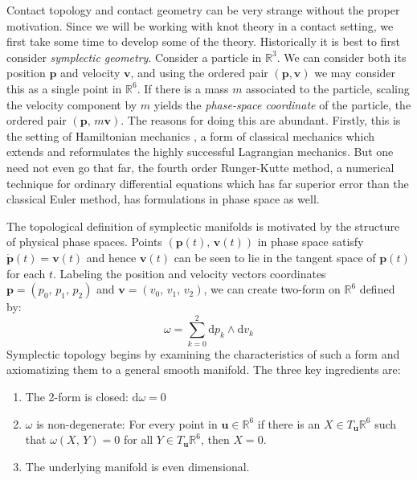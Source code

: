 Contact topology and contact geometry can be very strange without the
proper motivation. Since we will be working with knot theory in a contact
setting, we first take some time to develop some of the theory. Historically it
is best to first consider \textit{symplectic geometry}. Consider a particle
in $\mathbb{R}^{3}$. We can consider both its position $\mathbf{p}$ and
velocity $\mathbf{v}$, and using the ordered pair $(\mathbf{p},\mathbf{v})$
we may consider this as a single point in $\mathbb{R}^{6}$. If there is a mass
$m$ associated to the particle, scaling the velocity component by $m$ yields
the \textit{phase-space coordinate} of the particle, the ordered pair
$(\mathbf{p},\,m\mathbf{v})$. The reasons for doing this are abundant. Firstly,
this is the setting of Hamiltonian mechanics
\cite{HamiltonMechanics1833}, a form of classical mechanics which extends and
reformulates the highly successful Lagrangian mechanics. But one need not even
go that far, the fourth order Runger-Kutte method, a numerical technique for
ordinary differential equations which has far superior error than the classical
Euler method, has formulations in phase space as well.
\par\hfill\par
The topological definition of symplectic manifolds is motivated by the
structure of physical phase spaces. Points $(\mathbf{p}(t),\,\mathbf{v}(t))$ in
phase space satisfy $\dot{\mathbf{p}}(t)=\mathbf{v}(t)$ and hence
$\mathbf{v}(t)$ can be seen to lie in the tangent space of $\mathbf{p}(t)$ for
each $t$. Labeling the position and velocity vectors
coordinates $\mathbf{p}=(p_{0},\,p_{1},\,p_{2})$ and
$\mathbf{v}=(v_{0},\,v_{1},\,v_{2})$, we can create two-form on
$\mathbb{R}^{6}$ defined by:
\begin{equation}
    \label{eqn:symplectic_louiville_form}
    \omega=\sum_{k=0}^{2}\textrm{d}p_{k}\land\textrm{d}v_{k}
\end{equation}
Symplectic topology begins by examining the characteristics of such a form
and axiomatizing them to a general smooth manifold. The three key ingredients
are:
\begin{enumerate}
    \item The 2-form is closed: $\textrm{d}\omega=0$
    \item $\omega$ is non-degenerate: For every point in
        $\mathbf{u}\in\mathbb{R}^{6}$ if there is an
        $X\in{T}_{\mathbf{u}}\mathbb{R}^{6}$ such that
        $\omega(X,\,Y)=0$ for all $Y\in{T}_{\mathbf{u}}\mathbb{R}^{6}$, then
        $X=0$.
    \item The underlying manifold is even dimensional.
\end{enumerate}
